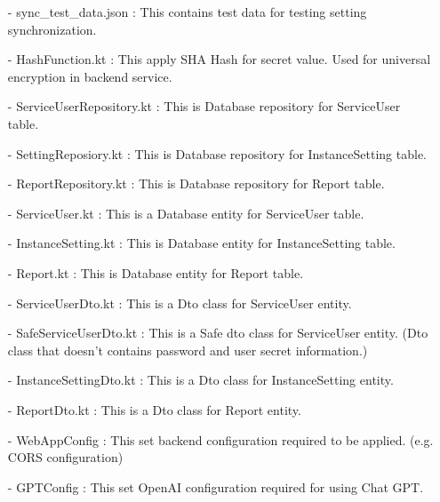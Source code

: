 \documentclass[conference]{IEEEtran}
\begin{document}
\begin{enumerate}
        \item [-] sync\_test\_data.json  : This contains test data for testing setting synchronization.\\
        \item [-] HashFunction.kt : This apply SHA Hash for secret value. Used for universal encryption in backend service.\\
        \item [-] ServiceUserRepository.kt : This is Database repository for ServiceUser table.\\
        \item [-] SettingReposiory.kt : This is Database repository for InstanceSetting table.\\
        \item [-] ReportRepository.kt : This is Database repository for Report table.\\
        \item [-] ServiceUser.kt : This is a Database entity for ServiceUser table.\\
        \item [-] InstanceSetting.kt : This is Database entity for InstanceSetting table.\\
        \item [-] Report.kt : This is  Database entity for Report table. \\
        \item [-] ServiceUserDto.kt : This is a Dto class for ServiceUser entity.\\
        \item [-] SafeServiceUserDto.kt : This is a  Safe dto class for ServiceUser entity. (Dto class that doesn't contains
password and user secret information.)\\
        \item [-] InstanceSettingDto.kt : This is a Dto class for InstanceSetting entity.\\
        \item [-] ReportDto.kt : This is a Dto class for Report entity.\\
        \item [-] WebAppConfig : This set backend configuration required to be applied. (e.g. CORS configuration)\
        \item [-] GPTConfig : This set OpenAI configuration required for using Chat GPT.\\
\end{enumerate}

\vspace{4cm}
\end{document}
